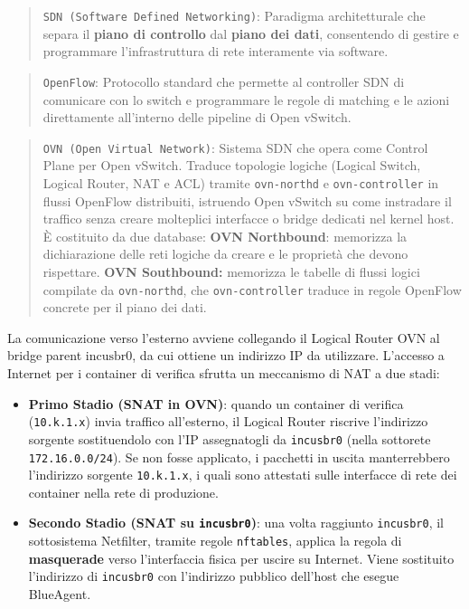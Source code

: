 \begin{quote}
\passthrough{\lstinline!SDN (Software Defined Networking)!}: Paradigma
architetturale che separa il \textbf{piano di controllo} dal
\textbf{piano dei dati}, consentendo di gestire e programmare
l'infrastruttura di rete interamente via software.
\end{quote}

\begin{quote}
\passthrough{\lstinline!OpenFlow!}: Protocollo standard che permette al
controller SDN di comunicare con lo switch e programmare le regole di
matching e le azioni direttamente all'interno delle pipeline di Open
vSwitch.
\end{quote}

\begin{quote}
\passthrough{\lstinline!OVN (Open Virtual Network)!}: Sistema SDN che
opera come Control Plane per Open vSwitch. Traduce topologie logiche
(Logical Switch, Logical Router, NAT e ACL) tramite
\passthrough{\lstinline!ovn-northd!} e
\passthrough{\lstinline!ovn-controller!} in flussi OpenFlow distribuiti,
istruendo Open vSwitch su come instradare il traffico senza creare
molteplici interfacce o bridge dedicati nel kernel host. È costituito da
due database: \textbf{OVN Northbound}: memorizza la dichiarazione delle
reti logiche da creare e le proprietà che devono rispettare. \textbf{OVN
Southbound:} memorizza le tabelle di flussi logici compilate da
\passthrough{\lstinline!ovn-northd!}, che
\passthrough{\lstinline!ovn-controller!} traduce in regole OpenFlow
concrete per il piano dei dati.
\end{quote}

La comunicazione verso l'esterno avviene collegando il Logical Router
OVN al bridge parent \(\text{incusbr0}\), da cui ottiene un indirizzo IP
da utilizzare. L'accesso a Internet per i container di verifica sfrutta
un meccanismo di NAT a due stadi:

\begin{itemize}
\tightlist
\item
  \textbf{Primo Stadio (SNAT in OVN)}: quando un container di verifica
  (\passthrough{\lstinline!10.k.1.x!}) invia traffico all'esterno, il
  Logical Router riscrive l'indirizzo sorgente sostituendolo con l'IP
  assegnatogli da \passthrough{\lstinline!incusbr0!} (nella sottorete
  \passthrough{\lstinline!172.16.0.0/24!}). Se non fosse applicato, i
  pacchetti in uscita manterrebbero l'indirizzo sorgente
  \passthrough{\lstinline!10.k.1.x!}, i quali sono attestati sulle
  interfacce di rete dei container nella rete di produzione.
\item
  \textbf{Secondo Stadio (SNAT su \passthrough{\lstinline!incusbr0!})}:
  una volta raggiunto \passthrough{\lstinline!incusbr0!}, il
  sottosistema Netfilter, tramite regole
  \passthrough{\lstinline!nftables!}, applica la regola di
  \textbf{masquerade} verso l'interfaccia fisica per uscire su Internet.
  Viene sostituito l'indirizzo di \passthrough{\lstinline!incusbr0!} con
  l'indirizzo pubblico dell'host che esegue BlueAgent.
\end{itemize}

